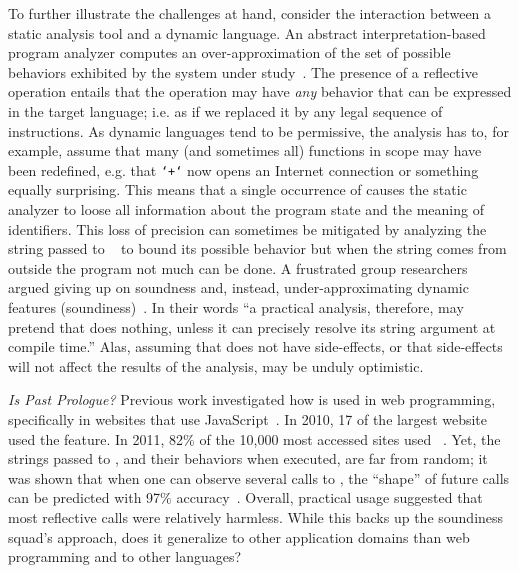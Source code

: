 \documentclass[USenglish,cleveref, autoref, thm-restate]{lipics-v2019}
\begin{document}
To further illustrate the challenges at hand, consider the interaction
between a static analysis tool and a dynamic language. An abstract
interpretation-based program analyzer computes an over-approximation
of the set of possible behaviors exhibited by the system under
study~\cite{cc77}. The presence of a reflective operation entails that
the operation may have \emph{any} behavior that can be expressed in
the target language; i.e. as if we replaced it by any legal sequence
of instructions. As dynamic languages tend to be permissive, the
analysis has to, for example, assume that many (and sometimes all)
functions in scope may have been redefined, e.g. that \texttt{`+`} now
opens an Internet connection or something equally surprising. This
means that a single occurrence of \eval causes the static analyzer to
loose all information about the program state and the meaning of
identifiers. This loss of precision can sometimes be mitigated by
analyzing the string passed to \eval~\cite{} to bound its possible
behavior but when the string comes from outside the program not much
can be done. A frustrated group researchers argued giving up on
soundness and, instead, under-approximating dynamic features
(soundiness)~\cite{soundy}. In their words ``a practical analysis,
therefore, may pretend that \eval does nothing, unless it can
precisely resolve its string argument at compile time.'' Alas,
assuming that \eval does not have side-effects, or that side-effects
will not affect the results of the analysis, may be unduly optimistic.

\vspace{2mm}\noindent\emph{Is Past Prologue?} Previous work
investigated how \eval is used in web programming, specifically in
websites that use JavaScript~\cite{pldi10a}. In 2010, 17 of the
largest website used the feature. In 2011, 82\% of the 10,000 most
accessed sites used \eval~\cite{ecoop11}.  Yet, the strings passed to
\eval, and their behaviors when executed, are far from random; it was
shown that when one can observe several calls to \eval, the ``shape''
of future calls can be predicted with 97\% accuracy~\cite{oopsla12b}.
Overall, practical usage suggested that most reflective calls were
relatively harmless. While this backs up the soundiness squad's
approach, does it generalize to other application domains than web
programming and to other languages?
\end{document}
